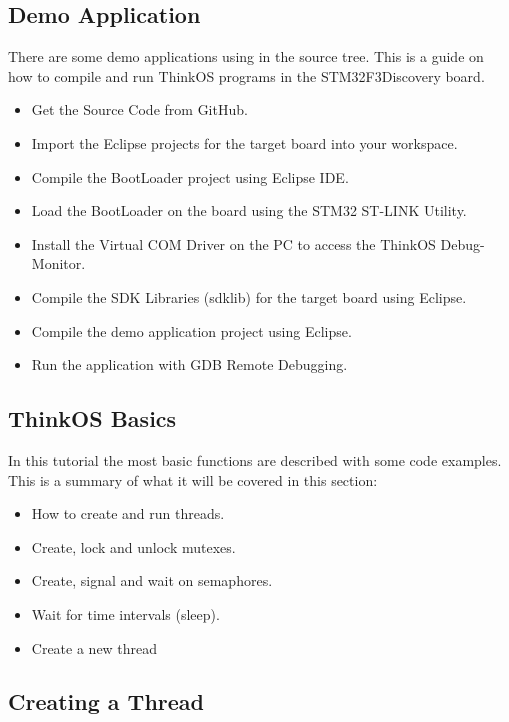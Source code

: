 \subsection{Demo Application}
There are some demo applications using \ThinkOS in the source tree. This is a guide on how to compile and run ThinkOS programs in the STM32F3Discovery board. 


\begin{itemize}
\item Get the \ThinkOS Source Code from GitHub.
\item Import the Eclipse projects for the target board into your workspace.
\item Compile the \ThinkOS BootLoader project using Eclipse IDE.
\item Load the \ThinkOS BootLoader on the board using the STM32 ST-LINK Utility.
\item Install the Virtual COM Driver on the PC to access the ThinkOS Debug-Monitor.
\item Compile the SDK Libraries (sdklib) for the target board using Eclipse.
\item Compile the demo application project using Eclipse.
\item Run the application with GDB Remote Debugging.
\end{itemize}



\subsection{ThinkOS Basics}

\lstset {language=C99}

In this tutorial the most basic \ThinkOS functions are described with some code examples. This is a summary of what it will be covered in this section:

\begin{itemize}
\item How to create and run threads.
\item Create, lock and unlock mutexes.
\item Create, signal and wait on semaphores.
\item Wait for time intervals (sleep).
\item Create a new thread
\end{itemize}

\subsection{Creating a Thread}

